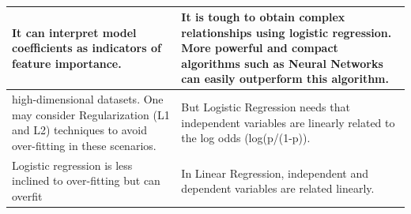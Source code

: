 \documentclass{template}
\begin{document}
\begin{table}[h]
\begin{center}
\begin{tabular}[t]{|p{6cm}|p{6cm}|}
         \hline 
        It can interpret model coefficients as indicators of feature importance. & It is tough to obtain complex relationships using logistic regression. More powerful and compact algorithms such as Neural Networks can easily outperform this algorithm. \\
         \hline 
        high-dimensional datasets. One may consider Regularization (L1 and L2) techniques to avoid over-fitting in these scenarios. & But Logistic Regression needs that independent variables are linearly related to the log odds (log(p/(1-p)).  \\
         \hline 
         Logistic regression is less inclined to over-fitting but can overfit  & In Linear Regression, independent and dependent variables are related linearly.  \\
          \hline 
    \end{tabular} 
  \end{center}
\caption{}
\end{table}
\end{document}
